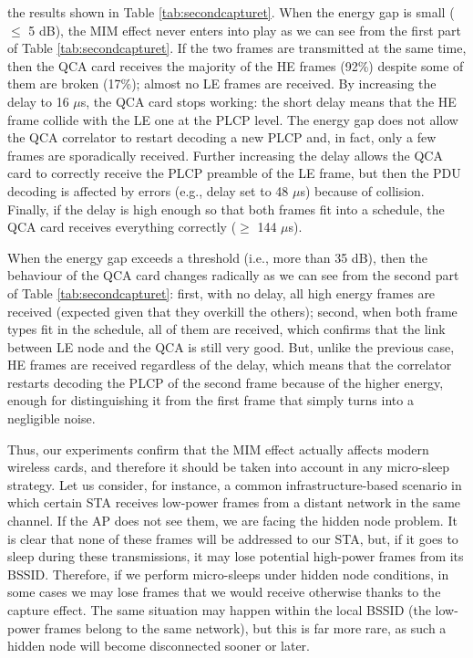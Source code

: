 \documentclass[twoside,nohyper]{tufte-book}
\begin{document}
 the results shown in Table \ref{tab:secondcapturet}. When the energy gap is small (\(\le\) 5 dB), the MIM effect never enters into play as we can see from the first part of Table \ref{tab:secondcapturet}. If the two frames are transmitted at the same time, then the QCA card receives the majority of the HE frames (92\%) despite some of them are broken (17\%); almost no LE frames are received. By increasing the delay to 16 \(\mu\)s, the QCA card stops working: the short delay means that the HE frame collide with the LE one at the PLCP level. The energy gap does not allow the QCA correlator to restart decoding a new PLCP and, in fact, only a few frames are sporadically received. Further increasing the delay allows the QCA card to correctly receive the PLCP preamble of the LE frame, but then the PDU decoding is affected by errors (e.g., delay set to 48 \(\mu\)s) because of collision. Finally, if the delay is high enough so that both frames fit into a schedule, the QCA card receives everything correctly (\(\ge\) 144 \(\mu\)s).

When the energy gap exceeds a threshold (i.e., more than 35 dB), then the behaviour of the QCA card changes radically as we can see from the second part of Table \ref{tab:secondcapturet}: first, with no delay, all high energy frames are received (expected given that they overkill the others); second, when both frame types fit in the schedule, all of them are received, which confirms that the link between LE node and the QCA is still very good. But, unlike the previous case, HE frames are received regardless of the delay, which means that the correlator restarts decoding the PLCP of the second frame because of the higher energy, enough for distinguishing it from the first frame that simply turns into a negligible noise.

Thus, our experiments confirm that the MIM effect actually affects modern wireless cards, and therefore it should be taken into account in any micro-sleep strategy. Let us consider, for instance, a common infrastructure-based scenario in which certain STA receives low-power frames from a distant network in the same channel. If the AP does not see them, we are facing the hidden node problem. It is clear that none of these frames will be addressed to our STA, but, if it goes to sleep during these transmissions, it may lose potential high-power frames from its BSSID. Therefore, if we perform micro-sleeps under hidden node conditions, in some cases we may lose frames that we would receive otherwise thanks to the capture effect. The same situation may happen within the local BSSID (the low-power frames belong to the same network), but this is far more rare, as such a hidden node will become disconnected sooner or later.
\end{document}
